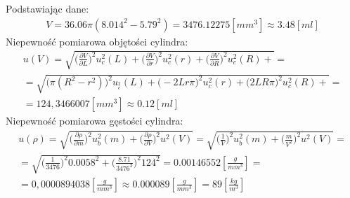 \documentclass[11pt]{article}
\begin{document}
    \noindent Podstawiając dane:
    \begin{gather*}
        V =  36.06\pi(8.014^2 - 5.79^2)=3476.12275[mm^3]\approx 3.48 [ml]
    \end{gather*}
    \noindent Niepewność pomiarowa objętości cylindra:
    \begin{gather*}
        u(V) = \sqrt{\biggl(\frac{\partial V}{\partial L}\biggr)^2 u_c^2(L)+
                {\biggl(\frac{\partial V}{\partial r}\biggr)^2 u_c^2(r)}+
                { \biggl(\frac{\partial V}{\partial R}\biggr)^2 u_c^2(R)}+}=\\
        =\sqrt{{ \biggl( \pi(R^2 - r^2) \biggr)^2 u__c^2(L)}+
                {\biggl(-2Lr\pi \biggr)^2 u_c^2(r)}+
                {\biggl(2LR\pi \biggr)^2 u_c^2(R)}+}=\\
        =124,3466007[mm^3]\approx 0.12[ml]
    \end{gather*}
    \noindent Niepewność pomiarowa gęstości cylindra:
    \begin{gather*}
        u(\rho)=\sqrt{\biggl(\frac{\partial \rho}{\partial m}\biggr)^2u_b^2(m)+
        \biggl(\frac{\partial \rho}{\partial V}\biggr)^2u^2(V)}
        =\sqrt{\biggl(\frac{1}{V} \biggr)^2u_b^2(m)+
        \biggl(\frac{m}{V^2}\biggr)^2u^2(V)}=\\
        =\sqrt{\biggl(\frac{1}{3476} \biggr)^2 0.0058^2+
        \biggl(\frac{8.71}{3476^2}\biggr)^2 124^2}=0.00146552[\frac{g}{mm^3}]=\\
        =0,0000894038[\frac{g}{mm^3}]\approx 0.000089[\frac{g}{mm^3}]= 89 [\frac{kg}{m^3}]
    \end{gather*}

\end{document}
